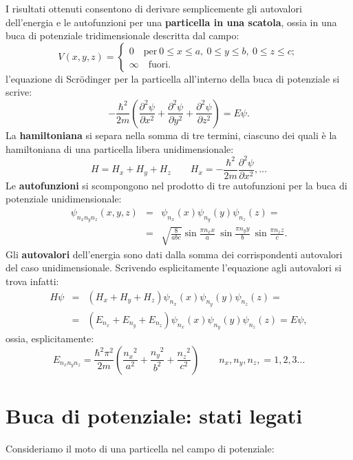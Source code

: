 \documentclass[a4paper,12pt,twoside]{book}
\begin{document}
I risultati ottenuti consentono di derivare semplicemente gli autovalori dell'energia e le autofunzioni per una \textbf{particella in una scatola}, ossia in una buca di potenziale tridimensionale descritta dal campo:
\begin{equation}
V(x,y,z)= 
\begin{cases}
0 \quad \textrm{per}\ 0\leq x \leq a,\ 0\leq y \leq b,\ 0 \leq z \leq c;\\
\infty \quad \textrm{fuori.}
\end{cases}
\end{equation}
l'equazione di Scr\"{o}dinger per la particella all'interno della buca di potenziale si scrive:
\begin{equation}
-\frac{\hbar ^2}{2m} \left( \frac{\partial ^2 \psi}{\partial x^2}+\frac{\partial ^2 \psi}{\partial y^2}+\frac{\partial ^2 \psi}{\partial z^2}\right) = E \psi.
\end{equation}
La \textbf{hamiltoniana} si separa nella somma di tre termini, ciascuno dei quali è la  hamiltoniana di una particella libera unidimensionale:
\begin{equation}
H= H_x+H_y+H_z \qquad H_x= -\frac{\hbar ^2}{2m}  \frac{\partial ^2 \psi}{\partial x^2}, \dots
\end{equation}
Le \textbf{autofunzioni} si scompongono nel prodotto di tre autofunzioni per la buca di potenziale unidimensionale:
\begin{eqnarray}
\psi _{n_x n_y n_z} (x,y,z) &=& \psi _{n_x}(x)\psi _{n_y}(y)\psi _{n_z}(z)= \nonumber \\
&=&\sqrt{\frac{8}{abc}}\sin \frac{\pi n_x x}{a}\ \sin \frac{\pi n_y y}{b}\ \sin \frac{\pi n_z z}{c}.
\end{eqnarray}
Gli \textbf{autovalori} dell'energia sono dati dalla somma dei corrispondenti autovalori del caso unidimensionale. Scrivendo esplicitamente l'equazione agli autovalori si trova infatti:
\begin{eqnarray}
H\psi  &=& \left(H_x+H_y+H_z\right) \psi _{n_x}(x)\psi _{n_y}(y)\psi _{n_z}(z)= \nonumber \\
&=& \left( E_{n_x}+E_{n_y}+E_{n_z}\right) \psi _{n_x}(x)\psi _{n_y}(y)\psi _{n_z}(z)=  E\psi,
\end{eqnarray}
ossia, esplicitamente:
\begin{equation}
E_{n_x n_y n_z}=\frac{\hbar ^2 \pi^2}{2m} \left(\frac{{n_x}^2}{a^2}+\frac{{n_y}^2}{b^2}+\frac{{n_z}^2}{c^2}\right) \qquad n_x, n_y, n_z, = 1,2,3... 
\end{equation}
\section{Buca di potenziale: stati legati}
Consideriamo il moto di una particella nel campo di potenziale:\\
\end{document}
